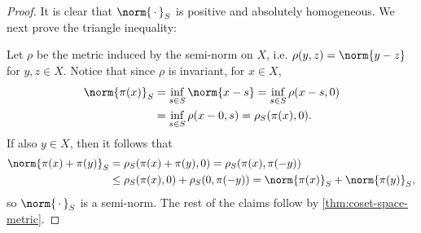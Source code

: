 \documentclass[article, a4paper, 11pt, oneside]{memoir}
\numberwithin{equation}{chapter}
\begin{document}
\begin{proof}
    It is clear that $\norm{\,\cdot\,}_S$ is positive and absolutely homogeneous. We next prove the triangle inequality:
    
    Let $\rho$ be the metric induced by the semi-norm on $X$, i.e. $\rho(y,z) = \norm{y - z}$ for $y,z \in X$. Notice that since $\rho$ is invariant, for $x \in X$,
    \begin{align*}
        \norm{\pi(x)}_S
            &= \inf_{s \in S} \norm{x - s}
             = \inf_{s \in S} \rho(x - s, 0) \\
            &= \inf_{s \in S} \rho(x - 0, s)
             = \rho_S(\pi(x), 0).
    \end{align*}
    If also $y \in X$, then it follows that
    \begin{align*}
        \norm{\pi(x) + \pi(y)}_S
            &= \rho_S(\pi(x) + \pi(y), 0)
             = \rho_S(\pi(x), \pi(-y)) \\
            &\leq \rho_S(\pi(x), 0) + \rho_S(0, \pi(-y))
             = \norm{\pi(x)}_S + \norm{\pi(y)}_S,
    \end{align*}
    so $\norm{\,\cdot\,}_S$ is a semi-norm. The rest of the claims follow by \cref{thm:coset-space-metric}.
\end{proof}


\nocite{*}

\printbibliography
\end{document}
